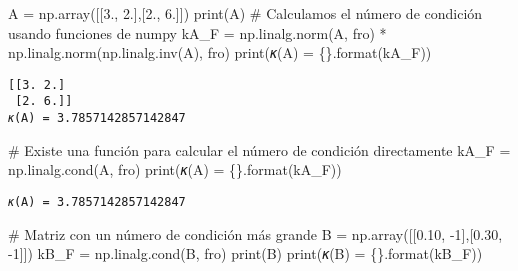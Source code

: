 \documentclass[
  letterpaper,
  DIV=11,
  numbers=noendperiod]{scrreprt}
\newenvironment{Shaded}{\begin{snugshade}}{\end{snugshade}}
\newcommand{\BuiltInTok}[1]{\textcolor[rgb]{0.00,0.23,0.31}{#1}}
\newcommand{\CommentTok}[1]{\textcolor[rgb]{0.37,0.37,0.37}{#1}}
\newcommand{\DecValTok}[1]{\textcolor[rgb]{0.68,0.00,0.00}{#1}}
\newcommand{\FloatTok}[1]{\textcolor[rgb]{0.68,0.00,0.00}{#1}}
\newcommand{\NormalTok}[1]{\textcolor[rgb]{0.00,0.23,0.31}{#1}}
\newcommand{\OperatorTok}[1]{\textcolor[rgb]{0.37,0.37,0.37}{#1}}
\newcommand{\SpecialCharTok}[1]{\textcolor[rgb]{0.37,0.37,0.37}{#1}}
\newcommand{\StringTok}[1]{\textcolor[rgb]{0.13,0.47,0.30}{#1}}
\begin{document}
\begin{Shaded}
\begin{Highlighting}[]
\NormalTok{A }\OperatorTok{=}\NormalTok{ np.array([[}\FloatTok{3.}\NormalTok{, }\FloatTok{2.}\NormalTok{],[}\FloatTok{2.}\NormalTok{, }\FloatTok{6.}\NormalTok{]])}
\BuiltInTok{print}\NormalTok{(A)}
\CommentTok{\# Calculamos el número de condición usando funciones de numpy}
\NormalTok{kA\_F }\OperatorTok{=}\NormalTok{ np.linalg.norm(A, }\StringTok{\textquotesingle{}fro\textquotesingle{}}\NormalTok{) }\OperatorTok{*}\NormalTok{ np.linalg.norm(np.linalg.inv(A), }\StringTok{\textquotesingle{}fro\textquotesingle{}}\NormalTok{)}
\BuiltInTok{print}\NormalTok{(}\StringTok{\textquotesingle{}𝜅(A) = }\SpecialCharTok{\{\}}\StringTok{\textquotesingle{}}\NormalTok{.}\BuiltInTok{format}\NormalTok{(kA\_F))}
\end{Highlighting}
\end{Shaded}

\begin{verbatim}
[[3. 2.]
 [2. 6.]]
𝜅(A) = 3.7857142857142847
\end{verbatim}

\begin{Shaded}
\begin{Highlighting}[]
\CommentTok{\# Existe una función para calcular el número de condición directamente}
\NormalTok{kA\_F }\OperatorTok{=}\NormalTok{ np.linalg.cond(A, }\StringTok{\textquotesingle{}fro\textquotesingle{}}\NormalTok{)}
\BuiltInTok{print}\NormalTok{(}\StringTok{\textquotesingle{}𝜅(A) = }\SpecialCharTok{\{\}}\StringTok{\textquotesingle{}}\NormalTok{.}\BuiltInTok{format}\NormalTok{(kA\_F))}
\end{Highlighting}
\end{Shaded}

\begin{verbatim}
𝜅(A) = 3.7857142857142847
\end{verbatim}

\begin{Shaded}
\begin{Highlighting}[]
\CommentTok{\# Matriz con un número de condición más grande}
\NormalTok{B }\OperatorTok{=}\NormalTok{ np.array([[}\FloatTok{0.10}\NormalTok{, }\OperatorTok{{-}}\DecValTok{1}\NormalTok{],[}\FloatTok{0.30}\NormalTok{, }\OperatorTok{{-}}\DecValTok{1}\NormalTok{]])}
\NormalTok{kB\_F }\OperatorTok{=}\NormalTok{ np.linalg.cond(B, }\StringTok{\textquotesingle{}fro\textquotesingle{}}\NormalTok{)}
\BuiltInTok{print}\NormalTok{(B)}
\BuiltInTok{print}\NormalTok{(}\StringTok{\textquotesingle{}𝜅(B) = }\SpecialCharTok{\{\}}\StringTok{\textquotesingle{}}\NormalTok{.}\BuiltInTok{format}\NormalTok{(kB\_F))}
\end{Highlighting}
\end{Shaded}
\end{document}
